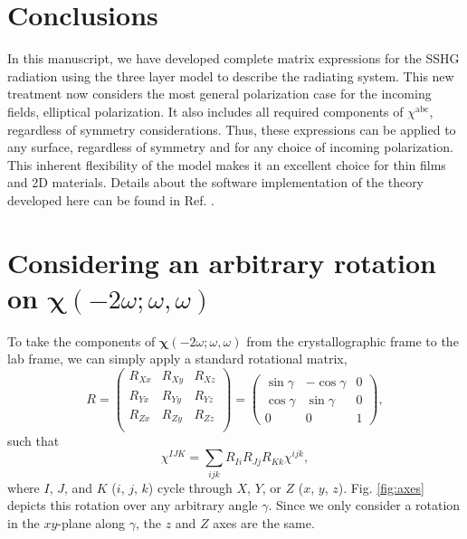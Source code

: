 \documentclass[aps,pra,10pt,amsmath,twocolumn,letterpaper]{revtex4-1}
\begin{document}

\section{Conclusions}

In this manuscript, we have developed complete matrix expressions for the SSHG
radiation using the three layer model to describe the radiating system. This new
treatment now considers the most general polarization case for the incoming
fields, elliptical polarization. It also includes all required components of
$\chi^{\mathrm{abc}}$, regardless of symmetry considerations. Thus, these
expressions can be applied to any surface, regardless of symmetry and for any
choice of incoming polarization. This inherent flexibility of the model makes it
an excellent choice for thin films and 2D materials. Details about the software
implementation of the theory developed here can be found in Ref.
\cite{andersonJOSS17}.



\appendix
\section{Considering an arbitrary rotation on
\texorpdfstring{$\boldsymbol{\chi}(-2\omega;\omega,\omega)$}{X(2w)}}
\label{app:rot}

To take the components of $\boldsymbol{\chi}(-2\omega;\omega,\omega)$ from the
crystallographic frame to the lab frame, we can simply apply a standard
rotational matrix,
\begin{equation*}
R =
\begin{pmatrix}
R_{Xx} & R_{Xy} & R_{Xz} \\
R_{Yx} & R_{Yy} & R_{Yz} \\
R_{Zx} & R_{Zy} & R_{Zz} \\
\end{pmatrix}
=
\begin{pmatrix}
\sin\gamma & -\cos\gamma & 0 \\
\cos\gamma &  \sin\gamma & 0 \\
    0    &      0    & 1
\end{pmatrix},
\end{equation*}
such that
\begin{equation*}
\chi^{IJK} = \sum_{ijk}R_{Ii}R_{Jj}R_{Kk}\chi^{ijk},
\end{equation*}
where $I$, $J$, and $K$ ($i$, $j$, $k$) cycle through $X$, $Y$, or $Z$ ($x$,
$y$, $z$). Fig. \ref{fig:axes} depicts this rotation over any arbitrary angle
$\gamma$. Since we only consider a rotation in the $xy$-plane along $\gamma$,
the $z$ and $Z$ axes are the same.
\end{document}
